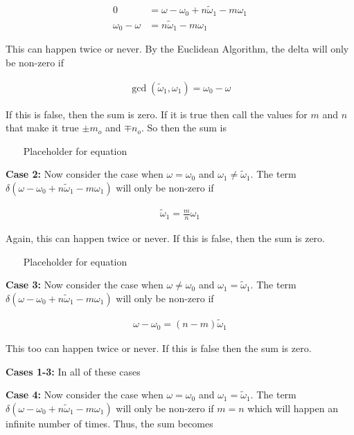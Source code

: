\documentclass[onecolumn, groupedaddress, 10pt]{revtex4-1}
\begin{document}
\begin{align}
                0 &= \omega - \omega_0 + n\widetilde{\omega}_1 - m\omega_1		\\
\omega_0 - \omega &= n\widetilde{\omega}_1 - m\omega_1
\end{align}

This can happen twice or never.  By the Euclidean Algorithm, the delta will only be non-zero if

\begin{align}
\gcd \left( \widetilde{\omega}_1, \omega_1 \right) = \omega_0 - \omega
\end{align}

If this is false, then the sum is zero.  If it is true then call the values for $m$ and $n$ that make it true $\pm m_o$ and $\mp n_o$.  So then the sum is 


~~~ Placeholder for equation ~~~


\textbf{Case 2:}  Now consider the case when $\omega = \omega_0$ and $\omega_1 \neq \widetilde{\omega}_1$.  The term $\delta(\omega - \omega_0 + n\widetilde{\omega}_1 - m\omega_1)$ will only be non-zero if

\begin{align}
\widetilde{\omega}_1 = \frac{m}{n} \omega_1
\end{align}

Again, this can happen twice or never.  If this is false, then the sum is zero.


~~~ Placeholder for equation ~~~


\textbf{Case 3:}  Now consider the case when $\omega \neq \omega_0$ and $\omega_1 = \widetilde{\omega}_1$.  The term $\delta(\omega - \omega_0 + n\widetilde{\omega}_1 - m\omega_1)$ will only be non-zero if

\begin{align}
\omega - \omega_0 = (n-m)\widetilde{\omega}_1
\end{align}

This too can happen twice or never.  If this is false then the sum is zero.


\textbf{Cases 1-3:}  In all of these cases

\textbf{Case 4:}  Now consider the case when $\omega = \omega_0$ and $\omega_1 = \widetilde{\omega}_1$.  The term $\delta(\omega - \omega_0 + n\widetilde{\omega}_1 - m\omega_1)$ will only be non-zero if $m=n$ which will happen an infinite number of times.  Thus, the sum becomes
\end{document}
